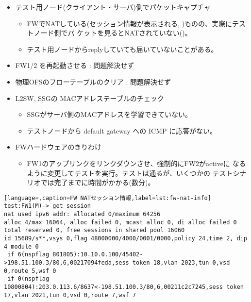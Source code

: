 \begin{itemize}
 \item テスト用ノード(クライアント・サーバ)側でパケットキャプチャ
       \begin{itemize}
        \item FWでNATしている(セッション情報が表示される,
              )ものの、実際にテストノード側でパ
              ケットを見るとNATされていない()。
        \item テスト用ノードからreplyしていても届いていないことがある。
       \end{itemize}
 \item FW1/2 を再起動させる : 問題解決せず
 \item 物理OFSのフローテーブルのクリア : 問題解決せず
 \item L2SW, SSGの MACアドレステーブルのチェック
       \begin{itemize}
        \item SSGがサーバ側のMACアドレスを学習できていない。
        \item テストノードから default gateway への ICMP に応答がない。
       \end{itemize}
 \item FWハードウェアのきりわけ
       \begin{itemize}
        \item FW1のアップリンクをリンクダウンさせ、強制的にFW2がactiveに
              なるように変更してテストを実行。テストは通るが、いくつかの
              テストシナリオでは完了までに時間がかかる(数分)。
       \end{itemize}
\end{itemize}

\begin{lstlisting}[language=,caption=FW NATセッション情報,label=lst:fw-nat-info]
test:FW1(M)-> get session
nat used ipv6 addr: allocated 0/maximum 64256
alloc 4/max 16064, alloc failed 0, mcast alloc 0, di alloc failed 0
total reserved 0, free sessions in shared pool 16060
id 15689/s**,vsys 0,flag 48000000/4000/0001/0000,policy 24,time 2, dip 4 module 0
 if 6(nspflag 801805):10.10.0.100/45402->198.51.100.3/80,6,00217094feda,sess token 18,vlan 2023,tun 0,vsd 0,route 5,wsf 0
 if 0(nspflag 10800804):203.0.113.6/8637<-198.51.100.3/80,6,00211c2c7245,sess token 17,vlan 2021,tun 0,vsd 0,route 7,wsf 7
\end{lstlisting}

